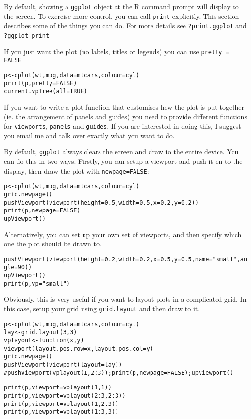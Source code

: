 By default, showing a {\tt ggplot} object at the R command prompt will display to the screen.  To exercise more control, you can call {\tt print} explicitly.  This section describes some of the things you can do.  For more details see {\tt ?print.ggplot} and {\tt ?ggplot\_print}.

If you just want the plot (no labels, titles or legends) you can use {\tt pretty = FALSE}

\begin{alltt}
p <- qplot(wt, mpg, data=mtcars, colour=cyl)
print(p, pretty = FALSE)
current.vpTree(all=TRUE)
\end{alltt}

If you want to write a plot function that customises how the plot is put together (ie. the arrangement of panels and guides) you need to provide different functions for {\tt viewports}, {\tt panels} and {\tt guides}.  If you are interested in doing this, I suggest you email me and talk over exactly what you want to do.

By default, {\tt ggplot} always clears the screen and draw to the entire device.  You can do this in two ways.  Firstly, you can setup a viewport and push it on to the display, then draw the plot with {\tt newpage=FALSE}:

\begin{alltt}
p <- qplot(wt, mpg, data=mtcars, colour=cyl)
grid.newpage()
pushViewport(viewport(height=0.5, width=0.5, x=0.2, y=0.2))
print(p, newpage=FALSE)
upViewport()
\end{alltt}

Alternatively, you can set up your own set of viewports, and then specify which one the plot should be drawn to.

\begin{alltt}
pushViewport(viewport(height=0.2, width=0.2, x=0.5, y=0.5, name="small", angle=90))
upViewport()
print(p, vp="small")
\end{alltt}

Obviously, this is very useful if you want to layout plots in a complicated grid.  In this case, setup your grid using {\tt grid.layout} and then draw to it.

\begin{alltt}
p <- qplot(wt, mpg, data=mtcars, colour=cyl)
lay <- grid.layout(3,3)
vplayout <- function(x, y) 
  viewport(layout.pos.row=x, layout.pos.col=y)
grid.newpage()
pushViewport(viewport(layout=lay))
#pushViewport(vplayout(1,2:3)); print(p, newpage=FALSE); upViewport()

print(p, viewport=vplayout(1,1))
print(p, viewport=vplayout(2:3,2:3))
print(p, viewport=vplayout(1, 2:3))
print(p, viewport=vplayout(1:3, 3))
\end{alltt}



